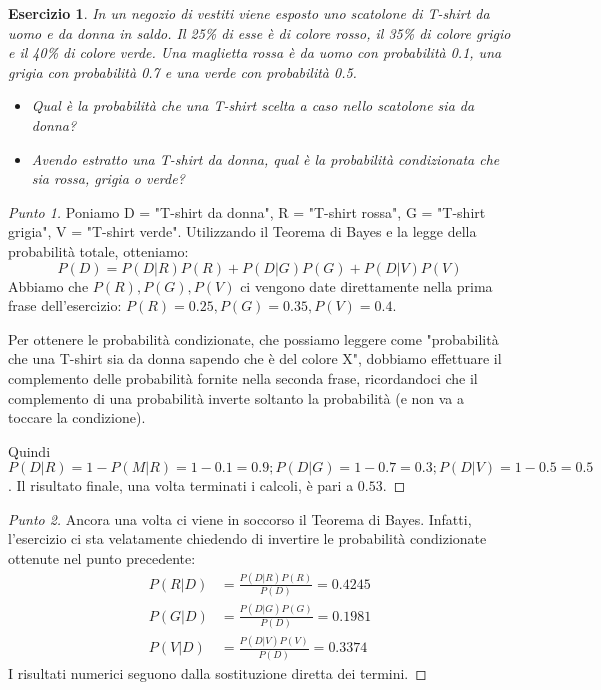\documentclass[12pt]{article}
\newtheorem{theorem}{Esercizio}
\renewcommand\qedsymbol{$\square$}
\begin{document}
\begin{theorem}
	In un negozio di vestiti viene esposto uno scatolone di T-shirt da uomo e da donna in saldo. Il 25\% di esse è di colore rosso, il 35\% di colore grigio e il 40\% di colore verde.
	Una maglietta rossa è da uomo con probabilità 0.1, una grigia con probabilità 0.7 e una verde con probabilità 0.5.
	\begin{itemize}
		\item Qual è la probabilità che una T-shirt scelta a caso nello scatolone sia da donna?
		\item Avendo estratto una T-shirt da donna, qual è la probabilità condizionata che sia rossa, grigia o verde?
	\end{itemize}
\end{theorem}

\renewcommand\qedsymbol{$\square$}

\begin{proof}[Punto 1]
	Poniamo D = "T-shirt da donna", R = "T-shirt rossa", G = "T-shirt grigia", V = "T-shirt verde". Utilizzando il Teorema di Bayes e la legge della probabilità totale, otteniamo:
	\[
		P(D) = P(D|R)P(R) + P(D|G)P(G) + P(D|V)P(V)
    \]
	Abbiamo che $P(R), P(G), P(V)$ ci vengono date direttamente nella prima frase dell'esercizio: $P(R) = 0.25, P(G)=0.35, P(V)=0.4$.
	
	Per ottenere le probabilità condizionate, che possiamo leggere come "probabilità che una T-shirt sia da donna sapendo che è del colore X", dobbiamo effettuare il complemento delle probabilità fornite nella seconda frase, ricordandoci che il complemento di una probabilità inverte soltanto la probabilità (e non va a toccare la condizione).
	
	Quindi $P(D|R) = 1 - P(M|R) = 1 - 0.1 = 0.9; P(D|G) = 1 - 0.7 = 0.3; P(D|V) = 1 - 0.5 = 0.5$. Il risultato finale, una volta terminati i calcoli, è pari a $0.53$.
\end{proof}

\renewcommand\qedsymbol{$\blacksquare$}

\begin{proof}[Punto 2]
	Ancora una volta ci viene in soccorso il Teorema di Bayes. Infatti, l'esercizio ci sta velatamente chiedendo di invertire le probabilità condizionate ottenute nel punto precedente:
	\begin{equation*}
		\begin{split}		
			P(R|D) & = \frac{P(D|R)P(R)}{P(D)} = 0.4245 \\
			P(G|D) & = \frac{P(D|G)P(G)}{P(D)} = 0.1981 \\
			P(V|D) & = \frac{P(D|V)P(V)}{P(D)} = 0.3374
		\end{split}
	\end{equation*}
	I risultati numerici seguono dalla sostituzione diretta dei termini.
\end{proof}
\end{document}
